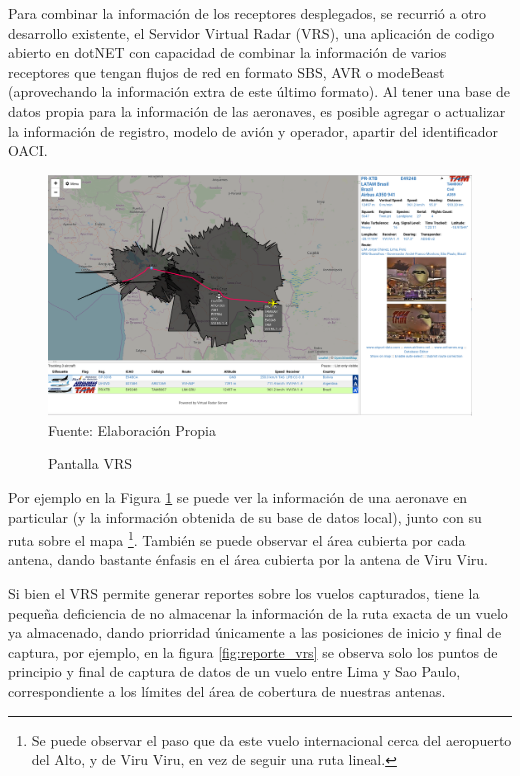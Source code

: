 \documentclass[fleqn,10pt]{SelfArx} %
\begin{document}
Para combinar la información de los receptores desplegados, se recurrió a otro desarrollo existente, el Servidor Virtual Radar (VRS), una aplicación de codigo abierto en dotNET con capacidad de combinar la información de varios receptores que tengan flujos de red en formato SBS, AVR o modeBeast (aprovechando la información extra de este último formato). Al tener una base de datos propia para la información de las aeronaves, es posible agregar o actualizar la información de registro, modelo de avión y operador, apartir del identificador OACI.

\begin{figure}[ht]
\caption{Pantalla VRS}
\centering
\includegraphics[width=0.9\linewidth]{vrs.png}
\newline Fuente: Elaboración Propia
\label{fig:vrs}
\end{figure}

Por ejemplo en la Figura \ref{fig:vrs} se puede ver la información de una aeronave en particular (y la información obtenida de su base de datos local), junto con su ruta sobre el mapa \footnote{Se puede observar el paso que da este vuelo internacional cerca del aeropuerto del Alto, y de Viru Viru, en vez de seguir una ruta lineal.}. También se puede observar el área cubierta por cada antena, dando bastante énfasis en el área cubierta por la antena de Viru Viru.

Si bien el VRS permite generar reportes sobre los vuelos capturados, tiene la pequeña deficiencia de no almacenar la información de la ruta exacta de un vuelo ya almacenado, dando priorridad únicamente a las posiciones de inicio y final de captura, por ejemplo, en la figura \ref{fig:reporte_vrs} se observa solo los puntos de principio y final de captura de datos de un vuelo entre Lima y Sao Paulo, correspondiente a los límites del área de cobertura de nuestras antenas.
\end{document}
